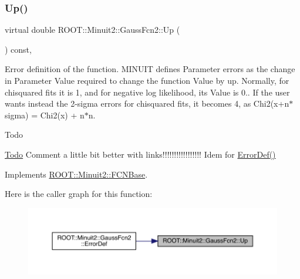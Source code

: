 \mbox{\label{classROOT_1_1Minuit2_1_1GaussFcn2_aef7172f9af50244bc9fce0c96cc21e81}} 
\subsubsection{\texorpdfstring{Up()}{Up()}\hspace{0.1cm}{\footnotesize\ttfamily [2/2]}}
{\footnotesize\ttfamily virtual double R\+O\+O\+T\+::\+Minuit2\+::\+Gauss\+Fcn2\+::\+Up (\begin{DoxyParamCaption}{ }\end{DoxyParamCaption}) const\hspace{0.3cm}{\ttfamily [inline]}, {\ttfamily [virtual]}}

Error definition of the function. M\+I\+N\+U\+IT defines Parameter errors as the change in Parameter Value required to change the function Value by up. Normally, for chisquared fits it is 1, and for negative log likelihood, its Value is 0.. If the user wants instead the 2-\/sigma errors for chisquared fits, it becomes 4, as Chi2(x+n$\ast$sigma) = Chi2(x) + n$\ast$n.

\begin{DoxyRefDesc}{Todo}
\item[\mbox{\hyperlink{todo__todo000001}{Todo}}]Comment a little bit better with links!!!!!!!!!!!!!!!!! Idem for \mbox{\hyperlink{classROOT_1_1Minuit2_1_1GaussFcn2_ac240f7b6ecbb7bf842d786e3914c620a}{Error\+Def()}}\end{DoxyRefDesc}


Implements \mbox{\hyperlink{classROOT_1_1Minuit2_1_1FCNBase_a04ef08ddad92ce8d89d498efbe021c39}{R\+O\+O\+T\+::\+Minuit2\+::\+F\+C\+N\+Base}}.

Here is the caller graph for this function\+:
\nopagebreak
\begin{figure}[H]
\begin{center}
\leavevmode
\includegraphics[width=350pt]{da/d5d/classROOT_1_1Minuit2_1_1GaussFcn2_aef7172f9af50244bc9fce0c96cc21e81_icgraph}
\end{center}
\end{figure}
\mbox{\label{classROOT_1_1Minuit2_1_1GaussFcn2_ae14a0349f83e8ffe7b2b1cda4e138113}} 
